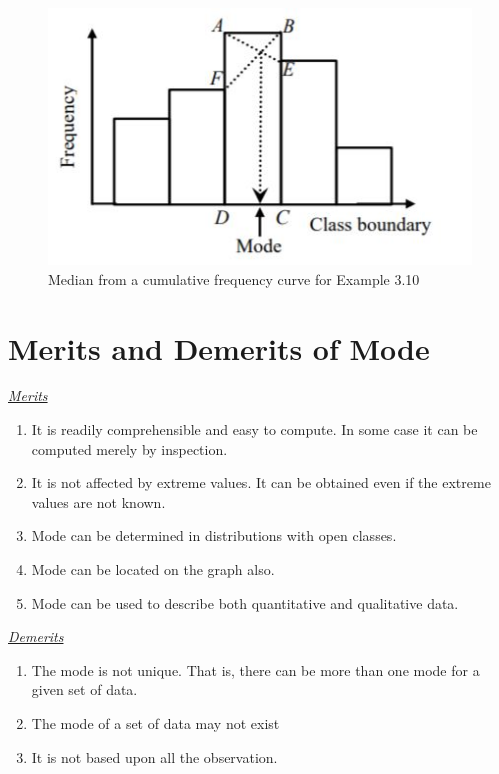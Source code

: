 \documentclass[
]{book}
\begin{document}
\begin{figure}

{\centering \includegraphics[width=0.4\linewidth]{images/l2m1} 

}

\caption{Median from a cumulative frequency curve for Example 3.10}\label{fig:cf1}
\end{figure}

\hypertarget{merits-and-demerits-of-mode}{%
\section{Merits and Demerits of Mode}\label{merits-and-demerits-of-mode}}

\underline{\emph{Merits}}

\begin{enumerate}
\def\labelenumi{\arabic{enumi}.}
\item
  It is readily comprehensible and easy to compute. In some case it
  can be computed merely by inspection.
\item
  It is not affected by extreme values. It can be obtained even if the
  extreme values are not known.
\item
  Mode can be determined in distributions with open classes.
\item
  Mode can be located on the graph also.
\item
  Mode can be used to describe both quantitative and qualitative data.
\end{enumerate}

\underline{\emph{Demerits}}

\begin{enumerate}
\def\labelenumi{\arabic{enumi}.}
\item
  The mode is not unique. That is, there can be more than one mode for
  a given set of data.
\item
  The mode of a set of data may not exist
\item
  It is not based upon all the observation.
\end{enumerate}

~\\
\hspace*{0.333em}\\
\hspace*{0.333em}
\end{document}
